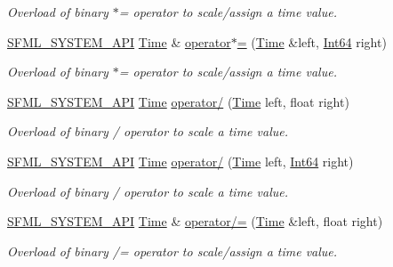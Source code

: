 \begin{DoxyCompactItemize}
\begin{DoxyCompactList}\small\item\em Overload of binary $\ast$= operator to scale/assign a time value. \end{DoxyCompactList}\item 
\hyperlink{_system_2_export_8hpp_a6476c9e422606477a4c23d92b1d79a1f}{S\-F\-M\-L\-\_\-\-S\-Y\-S\-T\-E\-M\-\_\-\-A\-P\-I} \hyperlink{classsf_1_1_time}{Time} \& \hyperlink{classsf_1_1_time_a6656a0a1a1802009a72d93fbba61f24a}{operator$\ast$=} (\hyperlink{classsf_1_1_time}{Time} \&left, \hyperlink{namespacesf_a2840579fed3494d9f330baf7a5a19903}{Int64} right)
\begin{DoxyCompactList}\small\item\em Overload of binary $\ast$= operator to scale/assign a time value. \end{DoxyCompactList}\item 
\hyperlink{_system_2_export_8hpp_a6476c9e422606477a4c23d92b1d79a1f}{S\-F\-M\-L\-\_\-\-S\-Y\-S\-T\-E\-M\-\_\-\-A\-P\-I} \hyperlink{classsf_1_1_time}{Time} \hyperlink{classsf_1_1_time_a3386c392dbc62e51dfa59730854d1ed2}{operator/} (\hyperlink{classsf_1_1_time}{Time} left, float right)
\begin{DoxyCompactList}\small\item\em Overload of binary / operator to scale a time value. \end{DoxyCompactList}\item 
\hyperlink{_system_2_export_8hpp_a6476c9e422606477a4c23d92b1d79a1f}{S\-F\-M\-L\-\_\-\-S\-Y\-S\-T\-E\-M\-\_\-\-A\-P\-I} \hyperlink{classsf_1_1_time}{Time} \hyperlink{classsf_1_1_time_ab72f2de3e2bb592b4b4008dc1ac79056}{operator/} (\hyperlink{classsf_1_1_time}{Time} left, \hyperlink{namespacesf_a2840579fed3494d9f330baf7a5a19903}{Int64} right)
\begin{DoxyCompactList}\small\item\em Overload of binary / operator to scale a time value. \end{DoxyCompactList}\item 
\hyperlink{_system_2_export_8hpp_a6476c9e422606477a4c23d92b1d79a1f}{S\-F\-M\-L\-\_\-\-S\-Y\-S\-T\-E\-M\-\_\-\-A\-P\-I} \hyperlink{classsf_1_1_time}{Time} \& \hyperlink{classsf_1_1_time_a9835490c54cab06492ec3aa9e9275ef9}{operator/=} (\hyperlink{classsf_1_1_time}{Time} \&left, float right)
\begin{DoxyCompactList}\small\item\em Overload of binary /= operator to scale/assign a time value. \end{DoxyCompactList}\item 

\end{DoxyCompactItemize}
